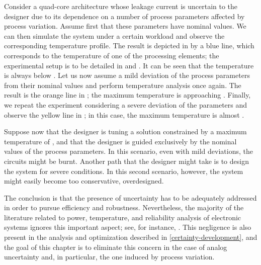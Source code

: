 Consider a quad-core architecture whose leakage current is uncertain to the
designer due to its dependence on a number of process parameters affected by
process variation. Assume first that these parameters have nominal values. We
can then simulate the system under a certain workload and observe the
corresponding temperature profile. The result is depicted in
 by a blue line, which corresponds to the temperature of
one of the processing elements; the experimental setup is to be detailed in
 and . It can be
seen that the temperature is always below . Let us now assume a mild
deviation of the process parameters from their nominal values and perform
temperature analysis once again. The result is the orange line in
; the maximum temperature is approaching .
Finally, we repeat the experiment considering a severe deviation of the
parameters and observe the yellow line in ; in this case,
the maximum temperature is almost .

Suppose now that the designer is tuning a solution constrained by a maximum
temperature of , and that the designer is guided exclusively by the
nominal values of the process parameters. In this scenario, even with mild
deviations, the circuits might be burnt. Another path that the designer might
take is to design the system for severe conditions. In this second scenario,
however, the system might easily become too conservative, overdesigned.

The conclusion is that the presence of uncertainty has to be adequately
addressed in order to pursue efficiency and robustness. Nevertheless, the
majority of the literature related to power, temperature, and reliability
analysis of electronic systems ignores this important aspect; see, for instance,
\cite{rao2009, rai2011, thiele2011}. This negligence is also present in the
analysis and optimization described in \cref{certainty-development}, and the
goal of this chapter is to eliminate this concern in the case of analog
uncertainty and, in particular, the one induced by process variation.
